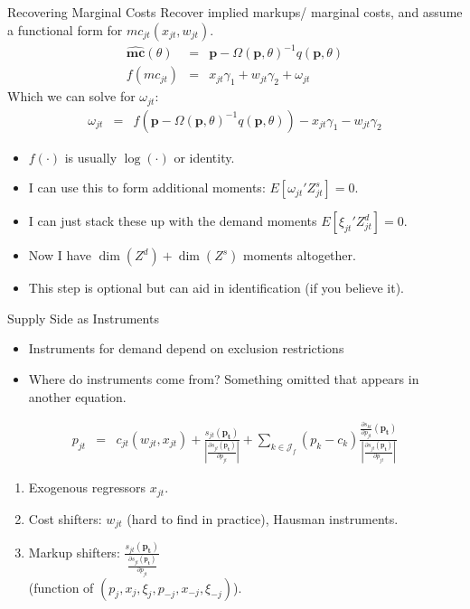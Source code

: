 \documentclass[xcolor=pdftex,dvipsnames,table,mathserif,aspectratio=169]{beamer}
\begin{document}
\begin{frame}{Recovering Marginal Costs }
Recover implied markups/ marginal costs, and assume a functional form for $mc_{jt}(x_{jt},w_{jt})$.
\begin{eqnarray*}
\widehat{\mathbf{mc}}(\theta)&=& \mathbf{p}- \Omega(\mathbf{p},\theta)^{-1} q(\mathbf{p},\theta)\\
f(mc_{jt}) &=& x_{jt} \gamma_1 + w_{jt} \gamma_2 + \omega_{jt}
\end{eqnarray*}
Which we can solve for $\omega_{jt}$:
\begin{eqnarray*}
\omega_{jt} &=&  f(\mathbf{p}- \Omega(\mathbf{p},\theta)^{-1} q(\mathbf{p},\theta)) - x_{jt} \gamma_1 - w_{jt} \gamma_2
\end{eqnarray*}
\begin{itemize}
\item $f(\cdot)$ is usually $\log(\cdot)$ or identity.
\item I can use this to form additional moments: $E[\omega_{jt}' Z_{jt}^{s}]=0$.
\item I can just stack these up with the demand moments $E[\xi_{jt}' Z_{jt}^d]=0$.
\item Now I have $\dim(Z^d) + \dim(Z^s)$ moments altogether.
\item This step is optional but can aid in identification (if you believe it).
\end{itemize}

\end{frame}

\begin{frame}{Supply Side as Instruments }
\begin{itemize}
\item Instruments for demand depend on \alert{exclusion restrictions}
\item Where do instruments come from? Something omitted that appears in another equation.
\end{itemize}
\begin{eqnarray*}
p_{jt}  &=& c_{jt}(w_{jt},x_{jt}) +  \frac{s_{jt}(\mathbf{p_t})}{\left|\frac{\partial s_{jt}(\mathbf{p_t})}{\partial p_{jt}}\right|}  +\sum_{k \in \mathcal{J}_f} (p_k - c_k) \frac{\frac{ \partial s_{kt}}{\partial p_{jt}}(\mathbf{p_t})}{\left|\frac{\partial s_{jt}(\mathbf{p_t})}{\partial p_{jt}}\right|}  
\end{eqnarray*}
\begin{enumerate}
\item Exogenous regressors $x_{jt}$.
\item Cost shifters: $w_{jt}$ (hard to find in practice), Hausman instruments.
\item Markup shifters:  $ \frac{s_{jt}(\mathbf{p_t})}{\frac{\partial s_{jt}(\mathbf{p_t})}{\partial p_{jt}}}$ \\(function of $(p_j,x_j,\xi_j, p_{-j},x_{-j},\xi_{-j})$).
\end{enumerate}
\end{frame}
\end{document}
